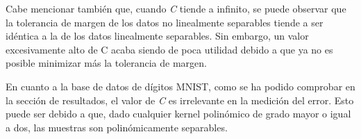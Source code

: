 \documentclass[a4paper]{article}
\begin{document}
\quad Cabe mencionar también que, cuando \textit{C} tiende a infinito, se puede observar que la tolerancia de margen de los datos no linealmente separables tiende a ser idéntica a la de los datos linealmente separables. Sin embargo, un valor excesivamente alto de C acaba siendo de poca utilidad debido a que ya no es posible minimizar más la tolerancia de margen.


\quad En cuanto a la base de datos de dígitos MNIST, como se ha podido comprobar en la sección de resultados, el valor de \textit{C} es irrelevante en la medición del error. Esto puede ser debido a que, dado cualquier kernel polinómico de grado mayor o igual a dos, las muestras son polinómicamente separables.
\end{document}
